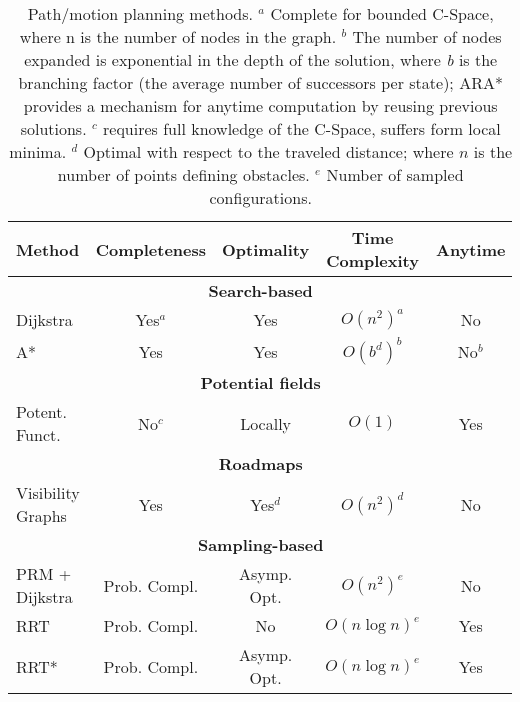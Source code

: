 \begin{table}[htbp]
\begin{center}
\begin{tabular}{ l c c c c }
  \hline
  \hline
  Method & Completeness & Optimality & Time Complexity & Anytime \\ \hline \hline
  \multicolumn{5}{c}{\textbf{Search-based}}\\ \hline
  Dijkstra & Yes$^{a}$ & Yes & $O(n^2)^{a}$ & No \\ \hline
  A* & Yes & Yes & $O(b^d)^{b}$ & No$^b$ \\ \hline
  \multicolumn{5}{c}{\textbf{Potential fields}}\\ \hline
  \makecell[l]{Potent. \\ Funct.} & No$^c$ & Locally & $O(1)$ & Yes
  \\ \hline \multicolumn{5}{c}{\textbf{Roadmaps}}\\ \hline
  \makecell[l]{Visibility \\Graphs} & Yes & Yes$^d$ & $O(n^2)^d$ & No \\ \hline
  \multicolumn{5}{c}{\textbf{Sampling-based}}\\ \hline
  \makecell[l]{PRM +\\ Dijkstra} & Prob. Compl. & Asymp. Opt. & $O(n^2)^e$ &
  No \\
  \hline RRT & Prob. Compl. & No & $O(n \log n)^e$ & Yes \\ \hline
  RRT* & Prob. Compl. & Asymp. Opt. & $O(n \log n)^e$ & Yes \\ \hline
\end{tabular}
\end{center}
\caption[Path/motion planning methods.]
{Path/motion planning methods. $^{a}$ Complete for bounded \ac{C-Space}, where n
is the number of nodes in the graph. $^{b}$ The number of nodes expanded is
exponential in the depth of the solution, where \textit{b} is the branching
factor (the average number of successors per state); ARA* provides a mechanism
for anytime computation by reusing previous solutions. $^c$ requires full
knowledge of the \ac{C-Space}, suffers form local minima. $^d$ Optimal with
respect to the traveled distance; where $n$ is the number of points defining
obstacles. $^e$ Number of sampled configurations.}
\label{table:SummaryPlanningMethdos}
\end{table}



